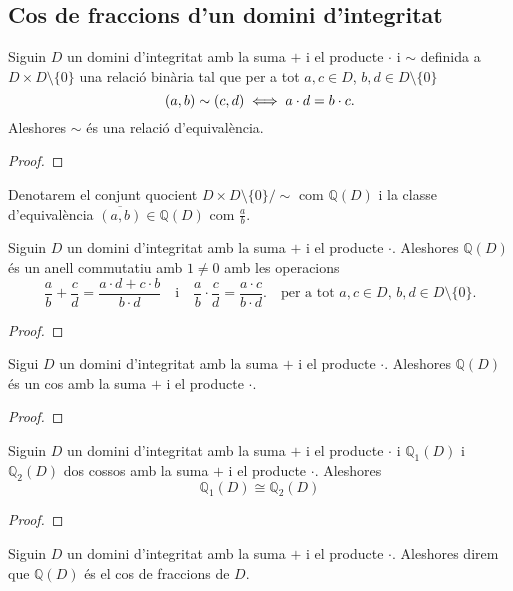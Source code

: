 \documentclass[../Apunts.tex]{subfiles}
\begin{document}
	\subsection{Cos de fraccions d'un domini d'integritat}
	\begin{proposition}
		\label{prop:relació d'equivalència cos de fraccions}
		Siguin \(D\) un domini d'integritat amb la suma \(+\) i el producte \(\cdot\) i \(\sim\) definida a \(D\times D\setminus\{0\}\) una relació binària tal que per a tot \(a,c\in D\), \(b,d\in D\setminus\{0\}\) 
		\[(a,b)\sim(c,d)\iff a\cdot d=b\cdot c.\]
		Aleshores \(\sim\) és una relació d'equivalència.
		\begin{proof}
		\end{proof}
	\end{proposition}
	\begin{notation}
		Denotarem el conjunt quocient \(D\times D\setminus\{0\}/\sim\) com \(\mathbb{Q}(D)\) i la classe d'equivalència \(\overline{(a,b)}\in\mathbb{Q}(D)\) com \(\frac{a}{b}\).
	\end{notation}
	\begin{lemma}
		\label{lema:cos de fraccions}
		Siguin \(D\) un domini d'integritat amb la suma \(+\) i el producte \(\cdot\). Aleshores \(\mathbb{Q}(D)\) és un anell commutatiu amb \(1\neq0\) amb les operacions
		\[\frac{a}{b}+\frac{c}{d}=\frac{a\cdot d+c\cdot b}{b\cdot d}\quad\text{i}\quad\frac{a}{b}\cdot\frac{c}{d}=\frac{a\cdot c}{b\cdot d}.\quad\text{per a tot }a,c\in D\text{, }b,d\in D\setminus\{0\}.\]
		\begin{proof}
		\end{proof}
	\end{lemma}
	\begin{theorem}
		\label{thm:cos de fraccions}
		Sigui \(D\) un domini d'integritat amb la suma \(+\) i el producte \(\cdot\). Aleshores \(\mathbb{Q}(D)\) és un cos amb la suma \(+\) i el producte \(\cdot\).
		\begin{proof}
		\end{proof}
	\end{theorem}
	\begin{theorem}
		\label{tmh:unicitat del cos de fraccions d'un domini}
		Siguin \(D\) un domini d'integritat amb la suma \(+\) i el producte \(\cdot\) i \(\mathbb{Q}_{1}(D)\) i \(\mathbb{Q}_{2}(D)\) dos cossos  amb la suma \(+\) i el producte \(\cdot\). Aleshores
		\[\mathbb{Q}_{1}(D)\cong\mathbb{Q}_{2}(D)\]
		\begin{proof}
		\end{proof}
	\end{theorem}
	\begin{definition}
		\label{def:cos de fraccions}
		Siguin \(D\) un domini d'integritat amb la suma \(+\) i el producte \(\cdot\). Aleshores direm que \(\mathbb{Q}(D)\) és el cos de fraccions de \(D\).
	\end{definition}
\end{document}
